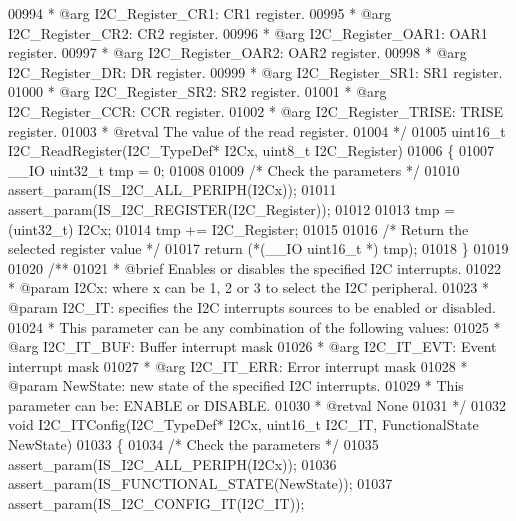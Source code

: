 \begin{DoxyCode}
00994 \textcolor{comment}{  *            @arg I2C\_Register\_CR1:  CR1 register.}
00995 \textcolor{comment}{  *            @arg I2C\_Register\_CR2:   CR2 register.}
00996 \textcolor{comment}{  *            @arg I2C\_Register\_OAR1:  OAR1 register.}
00997 \textcolor{comment}{  *            @arg I2C\_Register\_OAR2:  OAR2 register.}
00998 \textcolor{comment}{  *            @arg I2C\_Register\_DR:    DR register.}
00999 \textcolor{comment}{  *            @arg I2C\_Register\_SR1:   SR1 register.}
01000 \textcolor{comment}{  *            @arg I2C\_Register\_SR2:   SR2 register.}
01001 \textcolor{comment}{  *            @arg I2C\_Register\_CCR:   CCR register.}
01002 \textcolor{comment}{  *            @arg I2C\_Register\_TRISE: TRISE register.}
01003 \textcolor{comment}{  * @retval The value of the read register.}
01004 \textcolor{comment}{  */}
01005 uint16\_t I2C_ReadRegister(I2C\_TypeDef* I2Cx, uint8\_t I2C\_Register)
01006 \{
01007   \_\_IO uint32\_t tmp = 0;
01008 
01009   \textcolor{comment}{/* Check the parameters */}
01010   assert_param(IS\_I2C\_ALL\_PERIPH(I2Cx));
01011   assert_param(IS\_I2C\_REGISTER(I2C\_Register));
01012 
01013   tmp = (uint32\_t) I2Cx;
01014   tmp += I2C\_Register;
01015 
01016   \textcolor{comment}{/* Return the selected register value */}
01017   \textcolor{keywordflow}{return} (*(\_\_IO uint16\_t *) tmp);
01018 \}
01019 
01020 \textcolor{comment}{/**}
01021 \textcolor{comment}{  * @brief  Enables or disables the specified I2C interrupts.}
01022 \textcolor{comment}{  * @param  I2Cx: where x can be 1, 2 or 3 to select the I2C peripheral.}
01023 \textcolor{comment}{  * @param  I2C\_IT: specifies the I2C interrupts sources to be enabled or disabled. }
01024 \textcolor{comment}{  *          This parameter can be any combination of the following values:}
01025 \textcolor{comment}{  *            @arg I2C\_IT\_BUF: Buffer interrupt mask}
01026 \textcolor{comment}{  *            @arg I2C\_IT\_EVT: Event interrupt mask}
01027 \textcolor{comment}{  *            @arg I2C\_IT\_ERR: Error interrupt mask}
01028 \textcolor{comment}{  * @param  NewState: new state of the specified I2C interrupts.}
01029 \textcolor{comment}{  *          This parameter can be: ENABLE or DISABLE.}
01030 \textcolor{comment}{  * @retval None}
01031 \textcolor{comment}{  */}
01032 \textcolor{keywordtype}{void} I2C_ITConfig(I2C\_TypeDef* I2Cx, uint16\_t I2C\_IT, FunctionalState NewState)
01033 \{
01034   \textcolor{comment}{/* Check the parameters */}
01035   assert_param(IS\_I2C\_ALL\_PERIPH(I2Cx));
01036   assert_param(IS\_FUNCTIONAL\_STATE(NewState));
01037   assert_param(IS\_I2C\_CONFIG\_IT(I2C\_IT));

\end{DoxyCode}
